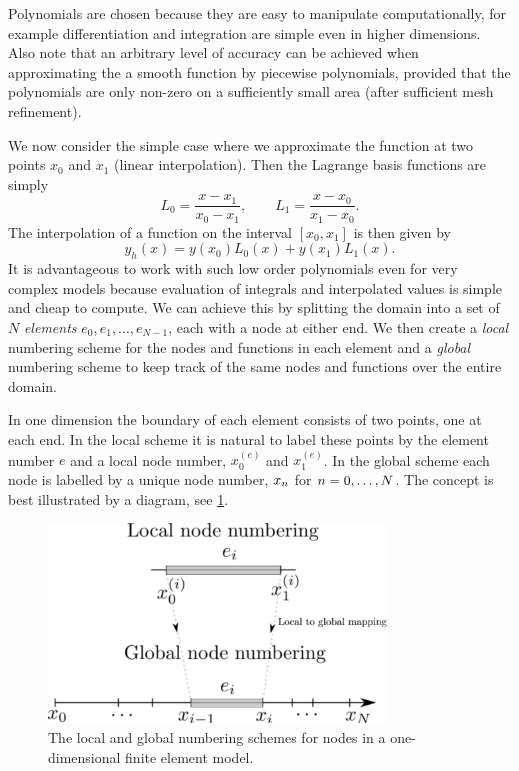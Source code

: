 Polynomials are chosen because they are easy to manipulate computationally, for example differentiation and integration are simple even in higher dimensions.
Also note that an arbitrary level of accuracy can be achieved when approximating the a smooth function by piecewise polynomials, provided that the polynomials are only non-zero on a sufficiently small area (\ie after sufficient mesh refinement).

We now consider the simple case where we approximate the function at two points $x_{0}$ and $x_{1}$ (linear interpolation).
Then the Lagrange basis functions are simply
\begin{equation}
  L_{0}=\dfrac{x-x_{1}}{x_{0}-x_{1}},\qquad
  L_{1}=\dfrac{x-x_{0}}{x_{1}-x_{0}}.
  \label{eq:simple_lagrange}
\end{equation}
The interpolation of a function on the interval $[x_{0},x_{1}]$ is then given by
\begin{equation}
  y_{h}(x)=y(x_{0})L_{0}(x)+y(x_{1})L_{1}(x).
\end{equation}
It is advantageous to work with such low order polynomials even for very complex models because evaluation of integrals and interpolated values is simple and cheap to compute.
We can achieve this by splitting the domain into a set of $N$ \emph{elements} $e_{0},e_{1},\ldots,e_{N-1}$, each with a node at either end. %
We then create a \emph{local} numbering scheme for the nodes and functions in each element and a \emph{global} numbering scheme to keep track of the same nodes and functions over the entire domain.

In one dimension the boundary of each element consists of two points, one at each end.
In the local scheme it is natural to label these points by the element number $e$ and a local node number, \ie $x_{0}^{(e)}$ and $x_{1}^{(e)}$.
In the global scheme each node is labelled by a unique node number, \ie $x_{n}$ for $n=0,\ldots,N$.
The concept is best illustrated by a diagram, see \cref{fig:local-global-numbering}.

\begin{figure}
  \center
  \includegraphics[width=0.8\textwidth]{./images/local_global_numbering}
  \caption{The local and global numbering schemes for nodes in a one-dimensional
    finite element model.}
  \label{fig:local-global-numbering}
\end{figure}

